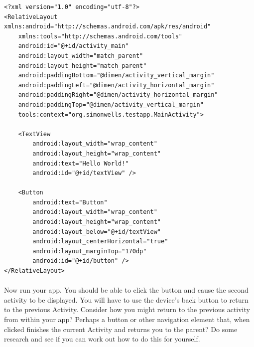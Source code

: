 \begin{lstlisting}
<?xml version="1.0" encoding="utf-8"?>
<RelativeLayout xmlns:android="http://schemas.android.com/apk/res/android"
    xmlns:tools="http://schemas.android.com/tools"
    android:id="@+id/activity_main"
    android:layout_width="match_parent"
    android:layout_height="match_parent"
    android:paddingBottom="@dimen/activity_vertical_margin"
    android:paddingLeft="@dimen/activity_horizontal_margin"
    android:paddingRight="@dimen/activity_horizontal_margin"
    android:paddingTop="@dimen/activity_vertical_margin"
    tools:context="org.simonwells.testapp.MainActivity">

    <TextView
        android:layout_width="wrap_content"
        android:layout_height="wrap_content"
        android:text="Hello World!"
        android:id="@+id/textView" />

    <Button
        android:text="Button"
        android:layout_width="wrap_content"
        android:layout_height="wrap_content"
        android:layout_below="@+id/textView"
        android:layout_centerHorizontal="true"
        android:layout_marginTop="170dp"
        android:id="@+id/button" />
</RelativeLayout>

\end{lstlisting}

\paragraph{} Now run your app. You should be able to click the button and cause the second activity to be displayed. You will have to use the device's back button to return to the previous Activity. Consider how you might return to the previous activity from within your app? Perhaps a button or other navigation element that, when clicked finishes the current Activity and returns you to the parent? Do some research and see if you can work out how to do this for yourself.




